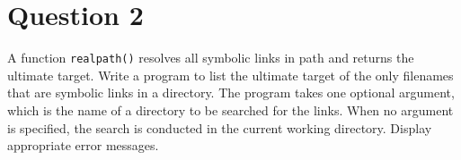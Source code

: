 \documentclass[main.tex]{subfiles}
\begin{document}
\section{Question 2}

A function \texttt{realpath()} resolves all symbolic links in path and returns
the ultimate target. Write a program to list the ultimate target of the only
filenames that are symbolic links in a directory. The program takes one optional
argument, which is the name of a directory to be searched for the links. When no
argument is specified, the search is conducted in the current working directory.
Display appropriate error messages.




\end{document}
